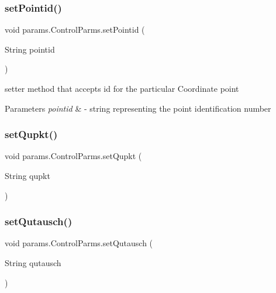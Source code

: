 \subsubsection{\texorpdfstring{set\+Pointid()}{setPointid()}}
{\footnotesize\ttfamily void params.\+Control\+Parms.\+set\+Pointid (\begin{DoxyParamCaption}\item[{String}]{pointid }\end{DoxyParamCaption})}



setter method that accepts id for the particular Coordinate point 


\begin{DoxyParams}{Parameters}
{\em pointid} & -\/ string representing the point identification number \\
\hline
\end{DoxyParams}
\mbox{\label{classparams_1_1_control_parms_a80c2c269b374d89c053bfd4ec569bc0d}} 
\subsubsection{\texorpdfstring{set\+Qupkt()}{setQupkt()}}
{\footnotesize\ttfamily void params.\+Control\+Parms.\+set\+Qupkt (\begin{DoxyParamCaption}\item[{String}]{qupkt }\end{DoxyParamCaption})}

\mbox{\label{classparams_1_1_control_parms_a2a551f64ac811a40f1a1fef83793f94d}} 
\subsubsection{\texorpdfstring{set\+Qutausch()}{setQutausch()}}
{\footnotesize\ttfamily void params.\+Control\+Parms.\+set\+Qutausch (\begin{DoxyParamCaption}\item[{String}]{qutausch }\end{DoxyParamCaption})}

